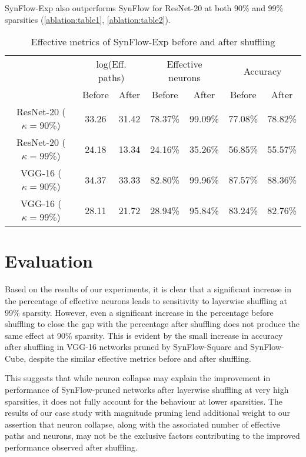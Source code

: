 SynFlow-Exp also outperforms SynFlow for ResNet-20 at both 90\% and 99\% sparsities  (\autoref{ablation:table1}, \autoref{ablation:table2}).
\begin{table}[h!]
\centering
\begin{tabular}{|c|cc|cc|cc|}
\hline
\multirow{2}{*}{} & \multicolumn{2}{c|}{log(Eff. paths)} & \multicolumn{2}{c|}{Effective neurons} & \multicolumn{2}{c|}{Accuracy} \\ \cline{2-7} 
                  & Before            & After            & Before             & After             & Before        & After         \\ \hline
ResNet-20 ($\kappa=90\%$)        & 33.26             & 31.42            & 78.37\%     & 99.09\%    & 77.08\%       & 78.82\%       \\ \hline
ResNet-20 ($\kappa=99\%$)        & 24.18             & 13.34            & 24.16\%     & 35.26\%    & 56.85\%       & 55.57\%       \\ \hline
VGG-16 ($\kappa=90\%$)           & 34.37             & 33.33            & 82.80\%     & 99.96\%    & 87.57\%       & 88.36\%       \\ \hline
VGG-16 ($\kappa=99\%$)           & 28.11             & 21.72            & 28.94\%     & 95.84\%    & 83.24\%       & 82.76\%       \\ \hline
\end{tabular}
\caption{Effective metrics of SynFlow-Exp before and after shuffling}
\label{table:sf-exp}
\end{table}

\section{Evaluation}
Based on the results of our experiments, it is clear that a significant increase in the percentage of effective neurons leads to sensitivity to layerwise shuffling at 99\% sparsity. However, even a significant increase in the percentage before shuffling to close the gap with the percentage after shuffling does not produce the same effect at 90\% sparsity. This is evident by the small increase in accuracy after shuffling in VGG-16 networks pruned by SynFlow-Square and SynFlow-Cube, despite the similar effective metrics before and after shuffling.

This suggests that while neuron collapse may explain the improvement in performance of SynFlow-pruned networks after layerwise shuffling at very high sparsities, it does not fully account for the behaviour at lower sparsities. The results of our case study with magnitude pruning lend additional weight to our assertion that neuron collapse, along with the associated number of effective paths and neurons, may not be the exclusive factors contributing to the improved performance observed after shuffling.

